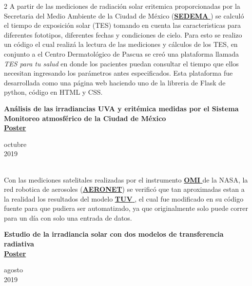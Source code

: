 \documentclass[a3paper,15pt]{adcv}
\newcommand*{\tuv}{\href{https://www2.acom.ucar.edu/modeling/tropospheric-ultraviolet-and-visible-tuv-radiation-model}{\textbf{TUV }}}
\newcommand*{\aeronet}{\href{https://aeronet.gsfc.nasa.gov/}{\textbf{AERONET}}}
\newcommand*{\sedema}{\href{https://www.sedema.cdmx.gob.mx/}{\textbf{SEDEMA} }}
\newcommand*{\omi}{\href{https://aura.gsfc.nasa.gov/omi.html}{\textbf{OMI} }}
\begin{document}
\begin{multicols}{2}
  A partir de las mediciones de radiación solar eritemica proporcionadas por la Secretaria del Medio Ambiente de la 
  Ciudad de México (\sedema) se calculó el tiempo de exposición solar (TES) tomando en cuenta las caracteristicas para  diferentes fototipos, diferentes fechas y condiciones de cielo.
   Para esto se realizo un código el cual realizá la lectura de las mediciones y cálculos de los TES, en conjunto a el Centro Dermatológico de Pascua 
  se creó una plataforma llamada \textit{TES para tu salud} en donde los pacientes puedan consultar el tiempo que ellos necesitan ingresando los parámetros antes especificados. Esta plataforma fue desarrollada como una
  página web haciendo uno de la libreria de Flask de python, código en HTML y CSS.\\

  \begin{minipage}{0.8\linewidth}
    \textbf{Análisis de las irradiancias UVA y eritémica medidas por el Sistema Monitoreo atmosférico de la Ciudad de México}\\
    \href{https://github.com/giovannilopez9808/Posters_templates/blob/master/2019/AFA/Analisis\%20indice\%20UV/Analisis\%20de\%20irradiancia.pdf}{\textbf{Poster}}
  \end{minipage}
    \begin{minipage}{0.2\linewidth}
      \vspace{-0.9cm}
      \begin{flushright}
      octubre \\2019
      \end{flushright}
    \end{minipage}\\

  Con las mediciones satelitales realizadas por el instrumento \omi de la NASA, la red robotica de aerosoles (\aeronet)
  se verificó que tan aproximadas estan a la realidad los resultados del modelo \tuv, el cual fue modificado en su código fuente para que pudiera ser automatizado, ya que
  originalmente solo puede correr para un día con solo una entrada de datos.\\

  \begin{minipage}{0.8\linewidth}
    \textbf{Estudio de la irradiancia solar con dos modelos de transferencia radiativa}\\
    \href{https://github.com/giovannilopez9808/Posters_templates/tree/master/2019/CNF/Transferencia\%20radiativa}{\textbf{Poster}}
  \end{minipage}
    \begin{minipage}{0.2\linewidth}
      \vspace{-0.9cm}
      \begin{flushright}
      agosto \\2019
      \end{flushright}
    \end{minipage}\\


\end{multicols}
\end{document}
